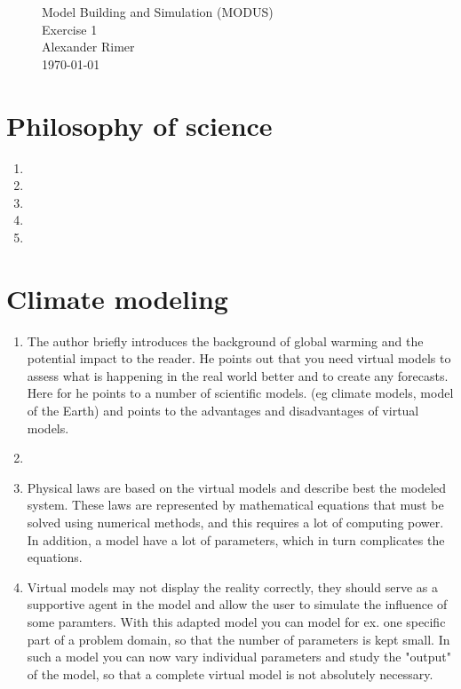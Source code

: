 \begin{figure}
\centering
{\Huge Model Building and Simulation (MODUS)}\\[0.5cm]
{\Huge Exercise 1}\\[0.5cm]
{\Large Alexander Rimer}\\[0.6cm]  
\today
\end{figure}

\section{Philosophy of science} 
\begin{enumerate}
	\item
	\item
	\item
	\item
	\item
\end{enumerate}
\section{Climate modeling}
\begin{enumerate}
  \item The author briefly introduces the background of global warming and the potential impact to the reader.
  		He points out that you need virtual models to assess what is happening in the real world better and to 
  		create any forecasts. Here for he  points to a number of scientific models. (eg climate models, model of the Earth) 
  		and points to the advantages and disadvantages of  virtual models.
  \item 
  \item	Physical laws are based on the virtual models and describe best the modeled system. These laws are represented by mathematical equations that must be solved 
  		using numerical methods, and this requires a lot of computing power. In addition, a model have a lot of parameters, which in turn complicates the equations.
  \item Virtual  models may not display the reality correctly, they should serve as a supportive 
  		agent in the model and allow the user to simulate the influence of some paramters.
  		With this adapted model you can model for ex. one specific part of a problem domain, so that the number of parameters is kept small. 
  		In such a model  you can now vary individual parameters and study the "output" of the model, so that a complete virtual model is not absolutely necessary.
  
\end{enumerate}

